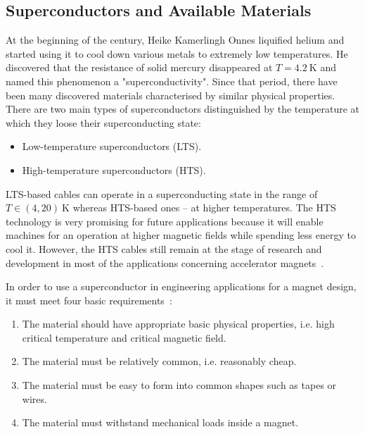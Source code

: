
\subsection{Superconductors and Available Materials}

At the beginning of the  century, Heike Kamerlingh Onnes liquified helium and started using it to cool down various metals to extremely low temperatures. He discovered that the resistance of solid mercury disappeared at $T=4.2~\text{K}$ and named this phenomenon a "superconductivity". Since that period, there have been many discovered materials characterised by similar physical properties. There are two main types of superconductors distinguished by the temperature at which they loose their superconducting state: 
\begin{itemize}
    \item Low-temperature superconductors (LTS).
    \item High-temperature superconductors (HTS).
\end{itemize}
LTS-based cables can operate in a superconducting state in the range of $T \in (4, 20)~\text{K}$ whereas HTS-based ones -- at higher temperatures. The HTS technology is very promising for future applications because it will enable machines for an operation at higher magnetic fields while spending less energy to cool it. However, the HTS cables still remain at the stage of research and development in most of the applications concerning accelerator magnets~\cite[p.~77-95]{evans_marvel_of_technology}. 

In order to use a superconductor in engineering applications for a magnet design, it must meet four basic requirements~\cite[p.~77-95]{evans_marvel_of_technology}:

\begin{enumerate}
    \item The material should have appropriate basic physical properties, i.e. high critical temperature and critical magnetic field.
    \item The material must be relatively common, i.e. reasonably cheap.
    \item The material must be easy to form into common shapes such as tapes or wires.
    \item The material must withstand mechanical loads inside a magnet.
\end{enumerate}

